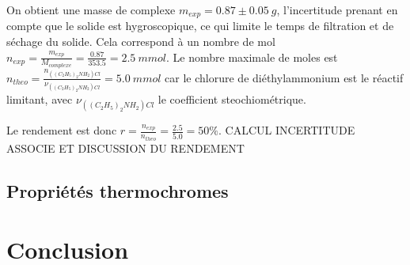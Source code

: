 \documentclass[12pt]{article}
\begin{document}
On obtient une masse de complexe $m_{exp}=0.87 \pm 0.05\ g$, l'incertitude prenant en compte que le solide est hygroscopique, ce qui limite le temps de filtration et de séchage du solide.
Cela correspond à un nombre de mol $n_{exp}=\frac{m_{exp}}{M_{complexe}}=\frac{0.87}{353.5}= 2.5 \ mmol$. 
Le nombre maximale de moles est $n_{theo}=\frac{n_{((C_2H_5)_2NH_2)Cl}}{\nu_{((C_2H_5)_2NH_2)Cl}}=5.0 \ mmol$ car le chlorure de diéthylammonium est le réactif limitant, avec $\nu_{((C_2H_5)_2NH_2)Cl}$ le coefficient steochiométrique.

Le rendement est donc $r=\frac{n_{exp}}{n_{theo}}=\frac{2.5}{5.0}=50 \%$. 
CALCUL INCERTITUDE ASSOCIE ET DISCUSSION DU RENDEMENT

\subsection{Propriétés thermochromes}


\section{Conclusion}
\end{document}
